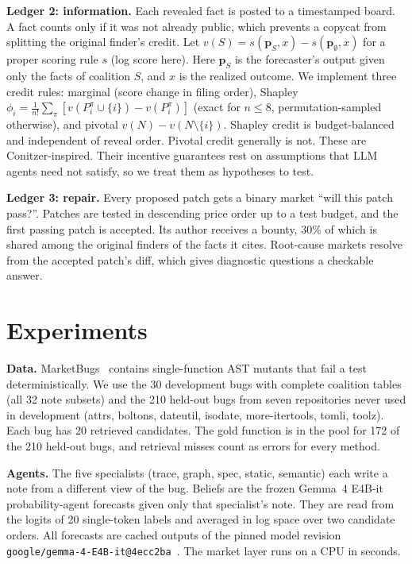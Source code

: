 \documentclass[10pt]{article}
\begin{document}
\textbf{Ledger 2: information.} Each revealed fact is posted to a timestamped board. A fact counts only if it was not already public, which prevents a copycat from splitting the original finder's credit. Let $v(S) = s(\mathbf{p}_S, x) - s(\mathbf{p}_\emptyset, x)$ for a proper scoring rule $s$ (log score here). Here $\mathbf{p}_S$ is the forecaster's output given only the facts of coalition $S$, and $x$ is the realized outcome. We implement three credit rules: marginal (score change in filing order), Shapley $\phi_i = \frac{1}{n!}\sum_\pi [v(P_i^\pi\cup\{i\}) - v(P_i^\pi)]$ (exact for $n\le 8$, permutation-sampled otherwise), and pivotal $v(N)-v(N\setminus\{i\})$. Shapley credit is budget-balanced and independent of reveal order. Pivotal credit generally is not. These are Conitzer-inspired. Their incentive guarantees rest on assumptions that LLM agents need not satisfy, so we treat them as hypotheses to test.

\textbf{Ledger 3: repair.} Every proposed patch gets a binary market ``will this patch pass?''. Patches are tested in descending price order up to a test budget, and the first passing patch is accepted. Its author receives a bounty, 30\% of which is shared among the original finders of the facts it cites. Root-cause markets resolve from the accepted patch's diff, which gives diagnostic questions a checkable answer.

\section{Experiments}\label{sec:exp}
\textbf{Data.} MarketBugs~\cite{marketbugs} contains single-function AST mutants that fail a test deterministically. We use the 30 development bugs with complete coalition tables (all 32 note subsets) and the 210 held-out bugs from seven repositories never used in development (attrs, boltons, dateutil, isodate, more-itertools, tomli, toolz). Each bug has 20 retrieved candidates. The gold function is in the pool for 172 of the 210 held-out bugs, and retrieval misses count as errors for every method.

\textbf{Agents.} The five specialists (trace, graph, spec, static, semantic) each write a note from a different view of the bug. Beliefs are the frozen Gemma~4 E4B-it probability-agent forecasts given only that specialist's note. They are read from the logits of 20 single-token labels and averaged in log space over two candidate orders. All forecasts are cached outputs of the pinned model revision \texttt{google/gemma-4-E4B-it@4ecc2ba}~\cite{marketbugs}. The market layer runs on a CPU in seconds.
\end{document}
